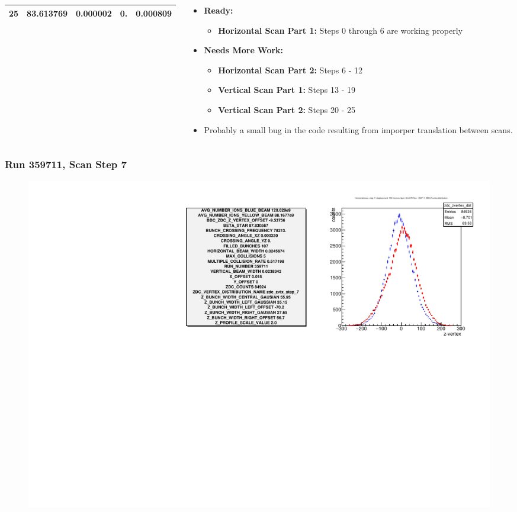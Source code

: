 \begin{frame}
\begin{columns}[onlytextwidth]
\begin{column}{0.5\textwidth}
{\begin{tabular}{c c c c c}
      25&83.613769&0.000002&0.&0.000809\\
      \bottomrule
    \end{tabular}
  }
\end{column}
\begin{column}{0.5\textwidth}
	\begin{itemize}
		\item\textbf{Ready:}
			\begin{itemize}
				\item \textbf{Horizontal Scan Part 1:} Steps 0 through 6 are working properly
			\end{itemize}
		\item\textbf{Needs More Work:}
				\begin{itemize}
					\item \textbf{Horizontal Scan Part 2:} Steps 6 - 12
					\item \textbf{Vertical Scan Part 1: } Steps 13 - 19
					\item \textbf{Vertical Scan Part 2: } Steps 20 - 25
				\end{itemize}
		\item Probably a small bug in the code resulting from imporper translation
			between scans.
		\end{itemize}
\end{column}
\end{columns}
\end{frame}

\begin{frame}
\frametitle{Run 359711, Scan Step 7}
\begin{figure}
\begin{center}
\includegraphics[width=\linewidth]{"figures/359711_step_7_zdc_zvertex"}
\caption{ }
\label{fig:359711_step_7_zdc_zvertex}
\end{center}\end{figure}
\end{frame}

